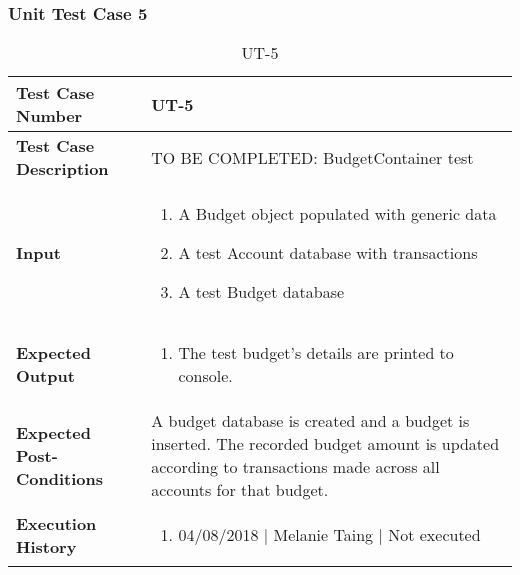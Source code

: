 \documentclass[12pt]{article}
\begin{document}
\subsubsection{Unit Test Case 5} \label{tc:1}
\def\arraystretch{1.5}%
\begin{table}[htbp]
\centering
\caption {UT-5}
\label{UT-5}
\begin{tabularx}{\textwidth}{ | l | X |}
\hline
\textbf{Test Case Number}      &  UT-5                         \\ \hline
\textbf{Test Case Description}    &  TO BE COMPLETED: BudgetContainer test                \\ \hline
\textbf{Input}         & 	\begin{enumerate}
	\item A Budget object populated with generic data
	\item A test Account database with transactions
	\item A test Budget database
\end{enumerate} \\ \hline

\textbf{Expected Output}     & \begin{enumerate}
	\item The test budget's details are printed to console.
\end{enumerate} \\ \hline
\textbf{Expected Post-Conditions}           & A budget database is created and a budget is inserted. The recorded budget amount is updated according to transactions made across all accounts for that budget.            \\ \hline
\textbf{Execution History}   &  \begin{enumerate}
	\item 04/08/2018 | Melanie Taing | Not executed
\end {enumerate} \\ \hline
\end{tabularx}
\end{table}
\clearpage
\end{document}
